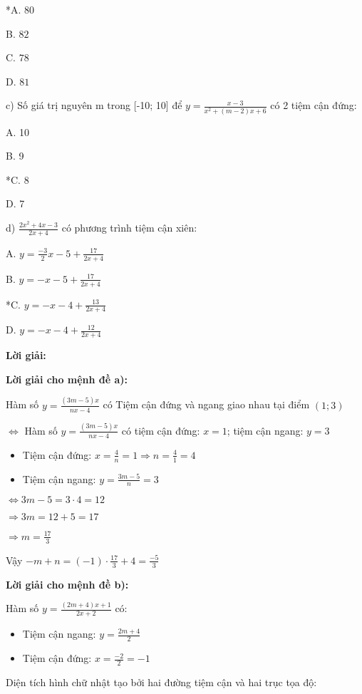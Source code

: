 \documentclass{article}
\begin{document}
*A. \(80\)

B. \(82\)

C. \(78\)

D. \(81\)


c) Số giá trị nguyên m trong [-10; 10] để \(y = \frac{x - 3}{x^2 + (m - 2)x + 6}\) có 2 tiệm cận đứng:

A. 10

B. 9

*C. 8

D. 7


d) \(\frac{2x^2 + 4x - 3}{2x + 4}\) có phương trình tiệm cận xiên:

A. \(y = \frac{-3}{2}x - 5 + \frac{17}{2x + 4}\)

B. \(y = -x - 5 + \frac{17}{2x + 4}\)

*C. \(y = -x - 4 + \frac{13}{2x + 4}\)

D. \(y = -x - 4 + \frac{12}{2x + 4}\)


\textbf{Lời giải:}

\textbf{Lời giải cho mệnh đề a):}

Hàm số \(y = \frac{(3m - 5)x}{nx - 4}\) có Tiệm cận đứng và ngang giao nhau tại điểm \((1; 3)\)

\(\Leftrightarrow\) Hàm số \(y = \frac{(3m - 5)x}{nx - 4}\) có tiệm cận đứng: \(x = 1\); tiệm cận ngang: \(y = 3\)

\begin{itemize}
\item Tiệm cận đứng:
\(x = \frac{4}{n} = 1 \Rightarrow n = \frac{4}{1} = 4\)
\item Tiệm cận ngang:
\(y = \frac{3m - 5}{n} = 3\)
\end{itemize}

\(\Leftrightarrow 3m - 5 = 3 \cdot 4 = 12\)

\(\Rightarrow 3m = 12 + 5 = 17\)

\(\Rightarrow m = \frac{17}{3}\)

Vậy \(-m + n = (-1) \cdot \frac{17}{3} + 4 = \frac{-5}{3}\)

\textbf{Lời giải cho mệnh đề b):}

Hàm số \(y = \frac{(2m + 4)x + 1}{2x + 2}\) có:

\begin{itemize}
\item Tiệm cận ngang: \(y = \frac{2m + 4}{2}\)
\item Tiệm cận đứng: \(x = \frac{-2}{2} = -1\)
\end{itemize}

Diện tích hình chữ nhật tạo bởi hai đường tiệm cận và hai trục tọa độ:
\end{document}
